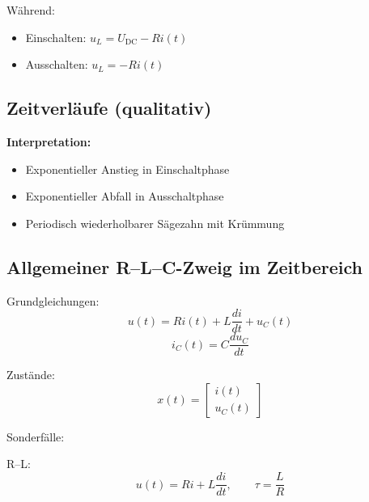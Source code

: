 Während:
\begin{itemize}
    \item Einschalten: $u_L = U_{\mathrm{DC}} - R i(t)$
    \item Ausschalten: $u_L = -R i(t)$
\end{itemize}

\subsection{Zeitverläufe (qualitativ)}

\begin{center}
\end{center}

\textbf{Interpretation:}
\begin{itemize}
    \item Exponentieller Anstieg in Einschaltphase
    \item Exponentieller Abfall in Ausschaltphase
    \item Periodisch wiederholbarer Sägezahn mit Krümmung
\end{itemize}

\subsection{Allgemeiner R--L--C-Zweig im Zeitbereich}

Grundgleichungen:
\[
u(t) = R i(t) + L \frac{di}{dt} + u_C(t)
\]
\[
i_C(t) = C \frac{du_C}{dt}
\]

Zustände:
\[
x(t) = \begin{bmatrix} i(t) \\ u_C(t) \end{bmatrix}
\]

Sonderfälle:

R--L:
\[
u(t) = R i + L \frac{di}{dt},
\qquad \tau = \frac{L}{R}
\]

